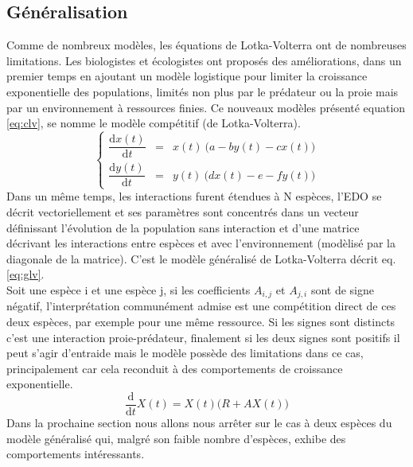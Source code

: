 \documentclass{wsdcr}
\begin{document}
\subsection{Généralisation}
Comme de nombreux modèles, les équations de Lotka-Volterra ont de nombreuses limitations. Les biologistes et écologistes ont  proposés des améliorations, dans un premier temps en ajoutant un modèle logistique pour limiter la croissance exponentielle des populations, limités non plus par le prédateur ou la proie mais par un environnement à ressources finies. Ce nouveaux modèles présenté equation \ref{eq:clv}, se nomme le modèle compétitif (de Lotka-Volterra).
\begin{equation}
\left\{
{\begin{array}{ccc}{\dfrac {\mathrm {d} x(t)}{\mathrm {d} t}}&=&x(t)\ {\Big (}a -b y(t)-c x(t){\Big )}\\{\dfrac {\mathrm {d} y(t)}{\mathrm {d} t}}&=&y(t)\ {\Big (}d x(t)-e -f y(t) {\Big )}\end{array}}
\right.
\label{eq:clv}
\end{equation}
Dans un même temps, les interactions furent étendues à N espèces, l'EDO se décrit vectoriellement et ses paramètres sont concentrés dans un vecteur définissant l'évolution de la population sans interaction et d'une matrice décrivant les interactions entre espèces et avec l'environnement (modèlisé par la diagonale de la matrice). C'est le modèle généralisé de Lotka-Volterra décrit eq.\ref{eq:glv}. \\
Soit une espèce i et une espèce j, si les coefficients $A_{i,j}$ et $A_{j,i}$ sont de signe négatif, l'interprétation communément admise est une compétition direct de ces deux espèces, par exemple pour une même ressource. Si les signes sont distincts c'est une interaction proie-prédateur, finalement si les deux signes sont positifs il peut s'agir d'entraide mais le modèle possède des limitations dans ce cas, principalement car cela reconduit à des comportements de croissance exponentielle.
\begin{equation}
\dfrac {\mathrm {d}}{\mathrm {d} t}X(t)=X(t) {\Big (}R+AX(t){\Big )}
\label{eq:glv}
\end{equation}
Dans la prochaine section nous allons nous arrêter sur le cas à deux espèces du modèle généralisé qui, malgré son faible nombre d'espèces, exhibe des comportements intéressants.
\end{document}
